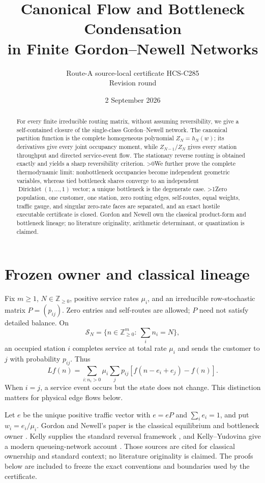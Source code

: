 \documentclass[10pt]{article}
\title{Canonical Flow and Bottleneck Condensation\\
in Finite Gordon--Newell Networks}
\author{Route-A source-local certificate HCS-C285\\
Revision round \CRevisionRound}
\date{2 September 2026}
\providecommand{\CRevisionRound}{2}
\newcommand{\Zp}{\mathbb Z_{\geq0}}
\newcommand{\Dir}{\operatorname{Dirichlet}}
\begin{document}
\maketitle
\begin{abstract}
For every finite irreducible routing matrix, without assuming reversibility,
we give a self-contained closure of the single-class Gordon--Newell network.
The canonical partition function is the complete homogeneous polynomial
$Z_N=h_N(w)$; its derivatives give every joint occupancy moment, while
$Z_{N-1}/Z_N$ gives every station throughput and directed service-event flow.
The stationary reverse routing is obtained exactly and yields a sharp
reversibility criterion.
\ifnum\CRevisionRound>0\relax\space We further prove the complete thermodynamic
limit: nonbottleneck occupancies become independent geometric variables,
whereas tied bottleneck shares converge to an independent
$\Dir(1,\ldots,1)$ vector; a unique bottleneck is the degenerate case.\fi
\ifnum\CRevisionRound>1\relax\space Zero population, one customer, one station,
zero routing edges, self-routes, equal weights, traffic gauge, and singular
zero-rate faces are separated, and an exact hostile executable certificate
is closed.\fi
\space Gordon and Newell own the classical product-form and bottleneck
lineage; no literature originality, arithmetic determinant, or quantization
is claimed.
\end{abstract}

\section{Frozen owner and classical lineage}
Fix $m\geq1$, $N\in\Zp$, positive service rates $\mu_i$, and an irreducible
row-stochastic matrix $P=(p_{ij})$.  Zero entries and self-routes are allowed;
$P$ need not satisfy detailed balance.  On
\[
 \mathcal S_N=\{n\in\Zp^m:\ \textstyle\sum_i n_i=N\},
\]
an occupied station $i$ completes service at total rate $\mu_i$ and sends the
customer to $j$ with probability $p_{ij}$.  Thus
\begin{equation}
 Lf(n)=\sum_{i:n_i>0}\mu_i\sum_jp_{ij}
       [f(n-e_i+e_j)-f(n)].                              \tag{1}
\end{equation}
When $i=j$, a service event occurs but the state does not change.  This
distinction matters for physical edge flows below.

Let $e$ be the unique positive traffic vector with
$e=eP$ and $\sum_i e_i=1$, and put $w_i=e_i/\mu_i$.  Gordon and Newell's
paper is the classical equilibrium and bottleneck owner
\cite{GordonNewell1967}.  Kelly supplies the standard reversal framework
\cite{Kelly1979}, and Kelly--Yudovina give a modern queueing-network account
\cite{KellyYudovina2014}.  Those sources are cited for classical ownership
and standard context; no literature originality is claimed.  The proofs
below are included to freeze the exact conventions and boundaries used by
the certificate.
\end{document}
